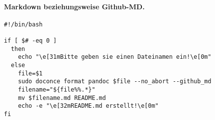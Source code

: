 \documentclass[%
oneside,                 %
final,                   %
chapterprefix=true,      %
open=right,              %
10pt]{book}
\begin{document}
\paragraph{Markdown beziehungsweise Github-MD.}

\begin{verbatim}
#!/bin/bash

if [ $# -eq 0 ]
  then
    echo "\e[31mBitte geben sie einen Dateinamen ein!\e[0m"
  else
    file=$1
    sudo doconce format pandoc $file --no_abort --github_md
    filename="${file%%.*}"
    mv $filename.md README.md
    echo -e "\e[32mREADME.md erstellt!\e[0m"
fi
\end{verbatim}


\end{document}
